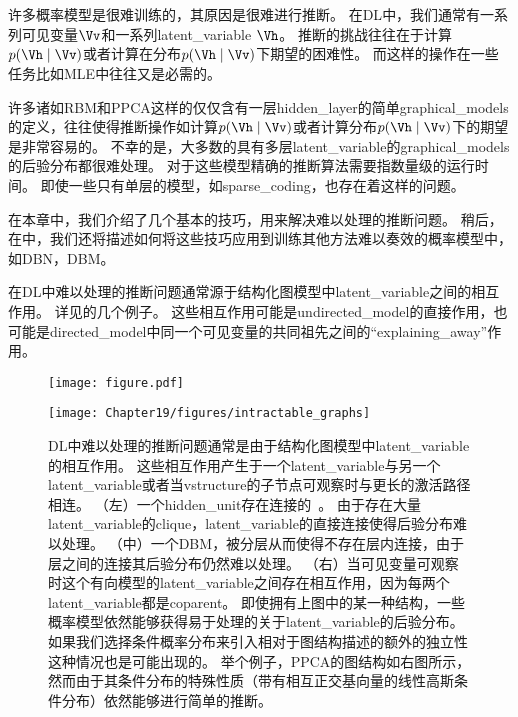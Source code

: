 \chapter{}
\label{chap:approximate_inference}


许多概率模型是很难训练的，其原因是很难进行推断。
在\gls{DL}中，我们通常有一系列可见变量$\Vv$和一系列\gls{latent_variable} $\Vh$。
推断的挑战往往在于计算$p(\Vh\mid\Vv)$或者计算在分布$p(\Vh\mid\Vv)$下期望的困难性。
而这样的操作在一些任务比如\gls{MLE}中往往又是必需的。

许多诸如\gls{RBM}和\gls{PPCA}这样的仅仅含有一层\gls{hidden_layer}的简单\gls{graphical_models}的定义，往往使得推断操作如计算$p(\Vh\mid\Vv)$或者计算分布$p(\Vh\mid\Vv)$下的期望是非常容易的。
不幸的是，大多数的具有多层\gls{latent_variable}的\gls{graphical_models}的后验分布都很难处理。
对于这些模型精确的推断算法需要指数量级的运行时间。
即使一些只有单层的模型，如\gls{sparse_coding}，也存在着这样的问题。


在本章中，我们介绍了几个基本的技巧，用来解决难以处理的推断问题。
稍后，在中，我们还将描述如何将这些技巧应用到训练其他方法难以奏效的概率模型中，如\gls{DBN}，\gls{DBM}。


在\gls{DL}中难以处理的推断问题通常源于结构化图模型中\gls{latent_variable}之间的相互作用。
详见的几个例子。
这些相互作用可能是\gls{undirected_model}的直接作用，也可能是\gls{directed_model}中同一个可见变量的共同祖先之间的``\gls{explaining_away}''作用。



\begin{figure}[!htb]
\ifOpenSource
\centerline{\texttt{[image: figure.pdf]}}
\else
	\centerline{\texttt{[image: Chapter19/figures/intractable\_graphs]}}
\fi
\caption{\gls{DL}中难以处理的推断问题通常是由于结构化图模型中\gls{latent_variable}的相互作用。
这些相互作用产生于一个\gls{latent_variable}与另一个\gls{latent_variable}或者当\gls{vstructure}的子节点可观察时与更长的激活路径相连。
（左）一个\gls{hidden_unit}存在连接的~\citep{Osindero+Hinton-2008}。
由于存在大量\gls{latent_variable}的\gls{clique}，\gls{latent_variable}的直接连接使得后验分布难以处理。
（中）一个\gls{DBM}，被分层从而使得不存在层内连接，由于层之间的连接其后验分布仍然难以处理。
（右）当可见变量可观察时这个有向模型的\gls{latent_variable}之间存在相互作用，因为每两个\gls{latent_variable}都是\gls{coparent}。
即使拥有上图中的某一种结构，一些概率模型依然能够获得易于处理的关于\gls{latent_variable}的后验分布。
如果我们选择条件概率分布来引入相对于图结构描述的额外的独立性这种情况也是可能出现的。
举个例子，\gls{PPCA}的图结构如右图所示，然而由于其条件分布的特殊性质（带有相互正交基向量的线性高斯条件分布）依然能够进行简单的推断。}
\label{fig:intractable_graphs}
\end{figure}



